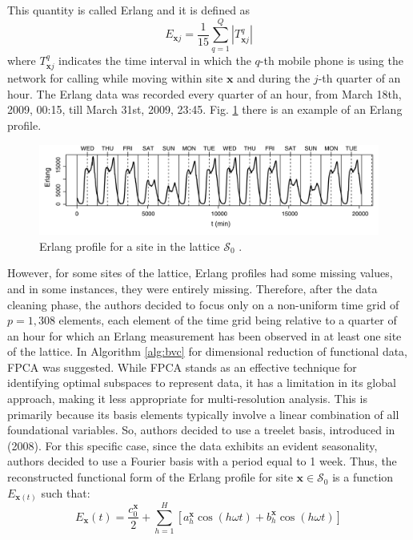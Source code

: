 This quantity is called Erlang and it is defined as
\begin{equation}
    \label{eq:erlang}
    E_{\mathbf{x}j}=\frac{1}{15}\sum_{q=1}^Q \left| T_{\mathbf{x}j}^q \right|
\end{equation}
where $T_{\mathbf{x}j}^q$ indicates the time interval in which the $q$-th mobile phone is using the network for calling while moving within site $\mathbf{x}$ and during the $j$-th quarter of an hour. The Erlang data was recorded every quarter of an hour, from March 18th, 2009, 00:15, till March 31st, 2009, 23:45. Fig. \ref{fig:secchino} there is an example of an Erlang profile.
\begin{figure}[H]
    \centering
    \includegraphics[scale=0.43]{Images/secchierlang.png}
    \caption[Erlang profile.]{Erlang profile for a site in the lattice $\mathcal{S}_0$ \cite{secchi_analysis_2015}.}
    \label{fig:secchino}
\end{figure}
However, for some sites of the lattice, Erlang profiles had some missing values, and in some instances, they were entirely missing. Therefore, after the data cleaning phase, the authors decided to focus only on a non-uniform time grid of $p = 1,308$ elements, each element of the time grid being relative to a quarter of an hour for which an Erlang measurement has been observed in at least one site of the lattice. In Algorithm \ref{alg:bvc} for dimensional reduction of functional data, FPCA was suggested. While FPCA stands as an effective technique for identifying optimal subspaces to represent data, it has a limitation in its global approach, making it less appropriate for multi-resolution analysis. This is primarily because its basis elements typically involve a linear combination of all foundational variables. So, authors decided to use a treelet basis, introduced in \citeauthor{lee_treeletsadaptive_2008} (2008). For this specific case, since the data exhibits an evident seasonality, authors decided to use a Fourier basis with a period equal to 1 week. Thus, the reconstructed functional form of the Erlang profile for site $\textbf{x} \in \mathcal{S}_0$ is a function $E_{\textbf{x}(t)}$ such that:
\begin{equation}
    E_{\textbf{x}}(t)=\frac{c_0^{\textbf{x}}}{2} + \sum_{h=1}^H \left[a_h^{\textbf{x}}\cos \left( h\omega t\right) + b_h^{\textbf{x}}\cos \left( h\omega t\right) \right]
\end{equation}
